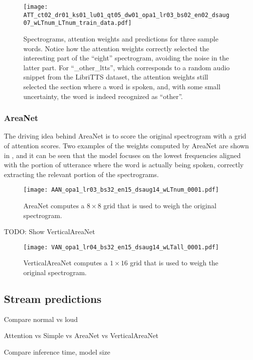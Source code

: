 \begin{figure*}[t!]
    \centering
    \texttt{[image: ATT\_ct02\_dr01\_ks01\_lu01\_qt05\_dw01\_opa1\_lr03\_bs02\_en02\_dsaug07\_wLTnum\_LTnum\_train\_data.pdf]}
    \caption{Spectrograms, attention weights and predictions for three sample words.
    Notice how the attention weights correctly selected the interesting part of
    the ``eight'' spectrogram, avoiding the noise in the latter part.
    For ``\_other\_ltts'', which corresponds to a random audio snippet from the LibriTTS
    dataset, the attention weights still selected the section where a word is spoken,
    and, with some small uncertainty, the word is indeed recognized as ``other''.}%
    \label{fig:attention_weights_standard}
\end{figure*}

\subsubsection{AreaNet}

The driving idea behind AreaNet is to score the original spectrogram with a
grid of attention scores. Two examples of the weights computed by AreaNet are
shown in , and it can be seen that the model
focuses on the lowest frequencies aligned with the portion of utterance where
the word is actually being spoken, correctly extracting the relevant portion 
of the spectrograms.

\begin{figure}[t!]
    \centering
    \texttt{[image: AAN\_opa1\_lr03\_bs32\_en15\_dsaug14\_wLTnum\_0001.pdf]}
    \caption{AreaNet computes a $8 \times 8$ grid that is used to weigh the
    original spectrogram.}%
    \label{fig:attention_weights_area}
\end{figure}

TODO: Show VerticalAreaNet

\begin{figure}[t!]
    \centering
    \texttt{[image: VAN\_opa1\_lr04\_bs32\_en15\_dsaug14\_wLTall\_0001.pdf]}
    \caption{VerticalAreaNet computes a $1 \times 16$ grid that is used to
        weigh the original 
    spectrogram.}%
    \label{fig:attention_weights_vertical}
\end{figure}
\subsection{Stream predictions}

Compare normal vs loud

Attention vs Simple vs AreaNet vs VerticalAreaNet

Compare inference time, model size
